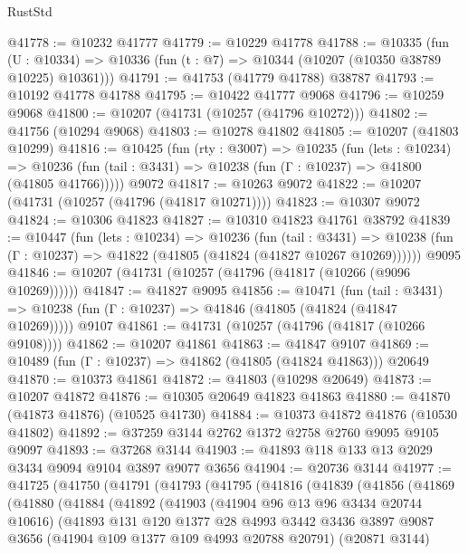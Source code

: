 \begin{lexlean}{RustStd}
\begin{coremodule}
@41778 := @10232 @41777
@41779 := @10229 @41778
@41788 := @10335
    (fun (U : @10334) => @10336 (fun (t : @7) => @10344 (@10207 (@10350 @38789 @10225) @10361)))
@41791 := @41753 (@41779 @41788) @38787
@41793 := @10192 @41778 @41788
@41795 := @10422 @41777 @9068
@41796 := @10259 @9068
@41800 := @10207 (@41731 (@10257 (@41796 @10272)))
@41802 := @41756 (@10294 @9068)
@41803 := @10278 @41802
@41805 := @10207 (@41803 @10299)
@41816 := @10425
    (fun (rty : @3007) =>
    @10235
      (fun (lets : @10234) =>
      @10236 (fun (tail : @3431) => @10238 (fun (Γ : @10237) => @41800 (@41805 @41766)))))
    @9072
@41817 := @10263 @9072
@41822 := @10207 (@41731 (@10257 (@41796 (@41817 @10271))))
@41823 := @10307 @9072
@41824 := @10306 @41823
@41827 := @10310 @41823 @41761 @38792
@41839 := @10447
    (fun (lets : @10234) =>
    @10236
      (fun (tail : @3431) =>
      @10238 (fun (Γ : @10237) => @41822 (@41805 (@41824 (@41827 @10267 @10269))))))
    @9095
@41846 := @10207 (@41731 (@10257 (@41796 (@41817 (@10266 (@9096 @10269))))))
@41847 := @41827 @9095
@41856 := @10471
    (fun (tail : @3431) => @10238 (fun (Γ : @10237) => @41846 (@41805 (@41824 (@41847 @10269)))))
    @9107
@41861 := @41731 (@10257 (@41796 (@41817 (@10266 @9108))))
@41862 := @10207 @41861
@41863 := @41847 @9107
@41869 := @10489 (fun (Γ : @10237) => @41862 (@41805 (@41824 @41863))) @20649
@41870 := @10373 @41861
@41872 := @41803 (@10298 @20649)
@41873 := @10207 @41872
@41876 := @10305 @20649 @41823 @41863
@41880 := @41870 (@41873 @41876) (@10525 @41730)
@41884 := @10373 @41872 @41876 (@10530 @41802)
@41892 := @37259 @3144 @2762 @1372 @2758 @2760 @9095 @9105 @9097
@41893 := @37268 @3144
@41903 := @41893 @118 @133 @13 @2029 @3434 @9094 @9104 @3897 @9077 @3656
@41904 := @20736 @3144
@41977 := @41725
    (@41750
      (@41791
        (@41793
          (@41795
            (@41816
              (@41839
                (@41856
                  (@41869
                    (@41880
                      (@41884
                        (@41892
                          (@41903
                            (@41904 @96 @13 @96 @3434 @20744 @10616)
                            (@41893
                              @131
                              @120
                              @1377
                              @28
                              @4993
                              @3442
                              @3436
                              @3897
                              @9087
                              @3656
                              (@41904 @109 @1377 @109 @4993 @20788 @20791)
                              (@20871 @3144)

\end{coremodule}
\end{lexlean}
